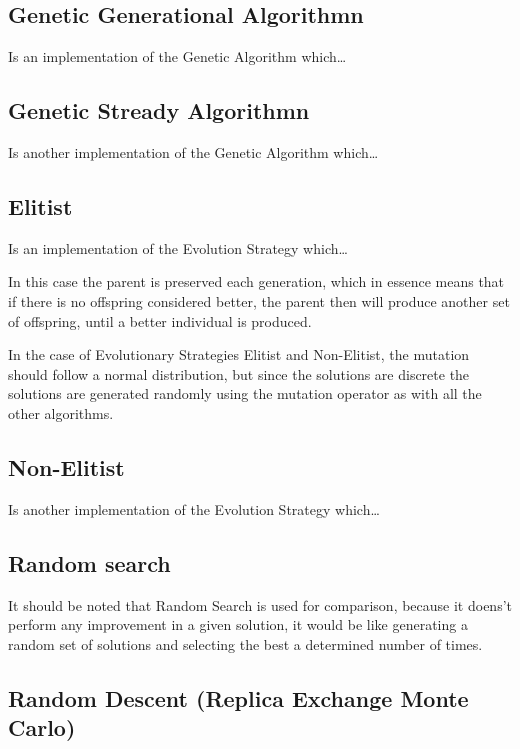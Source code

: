 \subsection{Genetic Generational Algorithmn}

Is an implementation of the Genetic Algorithm which\dots

\subsection{Genetic Stready Algorithmn}

Is another implementation of the Genetic Algorithm which\dots



\subsection{Elitist}

Is an implementation of the Evolution Strategy which\dots

In this case the parent is preserved each generation, which in essence means that if there is no offspring considered better, the parent then will produce another set of offspring, until a better individual is produced.


In the case of Evolutionary Strategies Elitist and Non-Elitist, the mutation should follow a normal distribution, but since the solutions are discrete the solutions are generated randomly using the mutation operator as with all the other algorithms.

\subsection{Non-Elitist}

Is another implementation of the Evolution Strategy which\dots

\subsection{Random search} 

It should be noted that Random Search is used for comparison, because it doens't perform any improvement in a given solution, it would be like generating a random set of solutions and selecting the best a determined number of times.

\subsection{Random Descent (Replica Exchange Monte Carlo)} 
